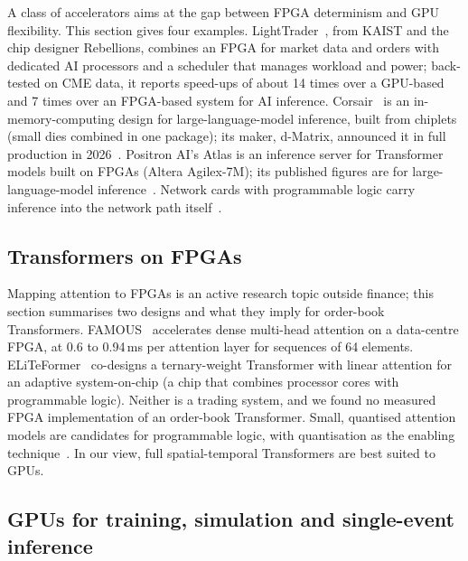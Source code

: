 A class of accelerators aims at the gap between FPGA determinism and GPU flexibility. This section gives four
examples.
LightTrader~\citep{lighttrader}, from KAIST and the chip designer Rebellions, combines an FPGA for
market data and orders with dedicated AI processors and a scheduler that manages workload and power;
back-tested on CME data, it reports speed-ups of about 14 times over a GPU-based and 7 times over an
FPGA-based system for AI inference. Corsair~\citep{corsair2025} is an in-memory-computing design for large-language-model inference, built from
chiplets (small dies combined in one package); its maker, d-Matrix, announced it in full production in
2026~\citep{dmatrix2026production}. Positron AI's Atlas is an inference server for Transformer models built on FPGAs (Altera Agilex-7M); its
published figures are for large-language-model inference~\citep{positron_atlas,eetimes2026positron}. Network cards with programmable logic carry inference into the
network path itself~\citep{napatech}.

\subsection{Transformers on FPGAs}

Mapping attention to FPGAs is an active research topic outside finance; this section summarises two designs and
what they imply for order-book Transformers. FAMOUS~\citep{famous}
accelerates dense multi-head attention on a data-centre FPGA, at 0.6 to 0.94\,ms per attention layer for sequences
of 64 elements.
ELiTeFormer~\citep{eliteformer} co-designs a ternary-weight Transformer with linear attention for an adaptive system-on-chip (a chip that combines processor cores with programmable logic).
Neither is a trading system, and we found no measured FPGA implementation of an order-book Transformer. Small,
quantised attention models are candidates for programmable logic, with quantisation as the enabling
technique~\citep{jacob2018}. In our view, full spatial-temporal Transformers are best suited to GPUs.

\subsection{GPUs for training, simulation and single-event inference}

